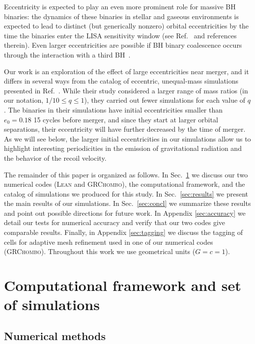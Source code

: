 \documentclass[floats,floatfix,showpacs,amssymb,physrev,twocolumn,superscriptaddress,reprint,
nofootinbib, longbibliography]{revtex4-2}
\begin{document}
Eccentricity is expected to play an even more prominent role for
massive BH binaries: the dynamics of these binaries in stellar and
gaseous environments is expected to lead to distinct (but generically
nonzero) orbital eccentricities by the time the binaries enter the
LISA sensitivity window (see Ref.~\cite{Roedig:2011rn} and references
therein). Even larger eccentricities are possible if BH binary
coalescence occurs through the interaction with a third
BH~\cite{Bonetti:2018tpf}.

Our work is an exploration of the effect of large eccentricities near
merger, and it differs in several ways from the catalog of eccentric,
unequal-mass simulations presented in Ref.~\cite{Huerta:2019oxn}.
While their study considered a larger range of mass ratios (in our
notation, $1/10\leq q\leq 1$), they carried out fewer simulations for
each value of $q$. The binaries in their simulations have initial
eccentricities smaller than $e_0 = 0.18$ 15 cycles before merger,
and since they start at larger orbital separations,
their eccentricity will have further decreased by the time of merger.
As we will see below, the larger initial eccentricities in
our simulations allow us to highlight interesting periodicities in the
emission of gravitational radiation and the behavior of the recoil
velocity.

The remainder of this paper is organized as follows.
%
In Sec.~\ref{sec:NR} we discuss our two numerical codes (\textsc{Lean}
and \textsc{GRChombo}), the computational framework, and the catalog
of simulations we produced for this study. In Sec.~\ref{sec:results}
we present the main results of our simulations. In
Sec.~\ref{sec:concl} we summarize these results and point out possible
directions for future work. In Appendix \ref{sec:accuracy} we
detail our tests for numerical accuracy and verify that
our two codes give comparable results.
Finally, in Appendix \ref{sec:tagging} we 
discuss the tagging of cells for adaptive mesh refinement used in one
of our numerical codes (\textsc{GRChombo}).
%
Throughout this work we use geometrical units ($G=c=1$).

\section{Computational framework and set of simulations}
\label{sec:NR}
% 
\subsection{Numerical methods}
\end{document}
